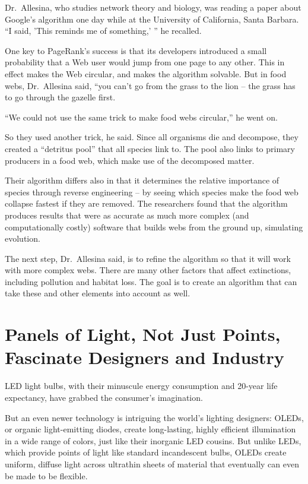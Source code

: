 ﻿\documentclass[12pt]{article}
\begin{document}
Dr.~Allesina, who studies network theory and biology, was reading a paper about Google's algorithm
one day while at the University of California, Santa Barbara. ``I said, 'This reminds me of
something,' '' he recalled.

One key to PageRank's success is that its developers introduced a small probability that a Web user
would jump from one page to any other. This in effect makes the Web circular, and makes the
algorithm solvable. But in food webs, Dr.~Allesina said, ``you can't go from the grass to the lion
-- the grass has to go through the gazelle first.

``We could not use the same trick to make food webs circular,'' he went on.

So they used another trick, he said. Since all organisms die and decompose, they created a
``detritus pool'' that all species link to. The pool also links to primary producers in a food web,
which make use of the decomposed matter.

Their algorithm differs also in that it determines the relative importance of species through
reverse engineering -- by seeing which species make the food web collapse fastest if they are
removed. The researchers found that the algorithm produces results that were as accurate as much
more complex (and computationally costly) software that builds webs from the ground up, simulating
evolution.

The next step, Dr.~Allesina said, is to refine the algorithm so that it will work with more complex
webs. There are many other factors that affect extinctions, including pollution and habitat loss.
The goal is to create an algorithm that can take these and other elements into account as well.

\section{Panels of Light, Not Just Points, Fascinate Designers and Industry}

\lettrine{L}{ED} light bulbs, with their minuscule energy consumption and 20-year life expectancy,
have grabbed the consumer's imagination.

But an even newer technology is intriguing the world's lighting designers: OLEDs, or organic
light-emitting diodes, create long-lasting, highly efficient illumination in a wide range of colors,
just like their inorganic LED cousins. But unlike LEDs, which provide points of light like standard
incandescent bulbs, OLEDs create uniform, diffuse light across ultrathin sheets of material that
eventually can even be made to be flexible.
\end{document}
